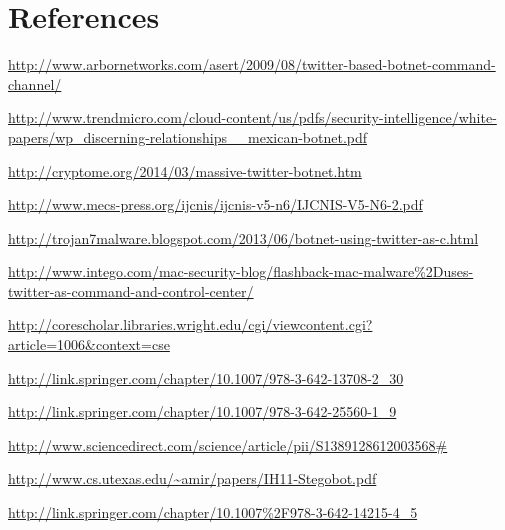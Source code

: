 \documentclass[11pt, oneside]{article} %
\numberwithin{equation}{section} %
\numberwithin{figure}{section} %
\numberwithin{table}{section} %
\begin{document}
\clearpage
\section{References}

\begingroup
\renewcommand{\section}[2]{}%
\begin{thebibliography}{99}

	\url{http://www.arbornetworks.com/asert/2009/08/twitter-based-botnet-command-channel/}

	\url{http://www.trendmicro.com/cloud-content/us/pdfs/security-intelligence/white-papers/wp_discerning-relationships__mexican-botnet.pdf}

	\url{http://cryptome.org/2014/03/massive-twitter-botnet.htm}

	\url{http://www.mecs-press.org/ijcnis/ijcnis-v5-n6/IJCNIS-V5-N6-2.pdf}

	\url{http://trojan7malware.blogspot.com/2013/06/botnet-using-twitter-as-c.html}

	\url{http://www.intego.com/mac-security-blog/flashback-mac-malware\%2Duses-twitter-as-command-and-control-center/}

	\url{http://corescholar.libraries.wright.edu/cgi/viewcontent.cgi?article=1006&context=cse}

	\url{http://link.springer.com/chapter/10.1007/978-3-642-13708-2_30}

	\url{http://link.springer.com/chapter/10.1007/978-3-642-25560-1_9}

	\url{http://www.sciencedirect.com/science/article/pii/S1389128612003568#}

	\url{http://www.cs.utexas.edu/~amir/papers/IH11-Stegobot.pdf}

	\url{http://link.springer.com/chapter/10.1007\%2F978-3-642-14215-4_5}

\end{thebibliography}

\endgroup
\end{document}
